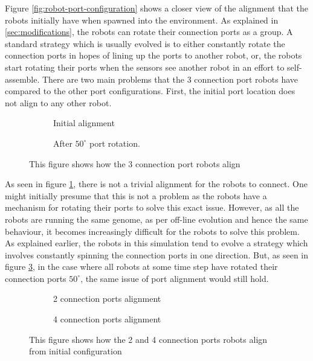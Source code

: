 Figure \ref{fig:robot-port-configuration} shows a closer view of the alignment that the robots initially have when spawned into the environment.
As explained in \ref{sec:modifications}, the robots can rotate their connection ports as a group.
A standard strategy which is usually evolved is to either constantly rotate the connection ports in hopes of lining up the ports to another robot, or, the robots start rotating their ports when the sensors see another robot in an effort to self-assemble.
There are two main problems that the 3 connection port robots have compared to the other port configurations.
First, the initial port location does not align to any other robot.


\begin{figure}[H]
	\begin{subfigure}[t]{0.49\textwidth}
		\centering
		\caption{Initial alignment}
		\label{3-port-guided-allignment}
	\end{subfigure}
	\begin{subfigure}[t]{0.49\textwidth}
		\centering
		\caption{After $50^{\circ}$ port rotation.}
		\label{3-port-guided-allignment-offset}
	\end{subfigure}
	\caption{This figure shows how the 3 connection port robots align}
\end{figure}


As seen in figure \ref{3-port-guided-allignment}, there is not a trivial alignment for the robots to connect.
One might initially presume that this is not a problem as the robots have a mechanism for rotating their ports to solve this exact issue.
However, as all the robots are running the same genome, as per off-line evolution and hence the same behaviour, it becomes increasingly difficult for the robots to solve this problem.
As explained earlier, the robots in this simulation tend to evolve a strategy which involves constantly spinning the connection ports in one direction.
But, as seen in figure \ref{3-port-guided-allignment-offset}, in the case where all robots at some time step have rotated their connection ports $50^{\circ}$, the same issue of port alignment would still hold.

\begin{figure}[H]
	\begin{subfigure}[t]{0.49\textwidth}
		\centering
		\caption{2 connection ports alignment}
		\label{2-port-guided-allignment}
	\end{subfigure}
	\begin{subfigure}[t]{0.49\textwidth}
		\centering
		\caption{4 connection ports alignment}
		\label{4-port-guided-allignment}
	\end{subfigure}
	\caption{This figure shows how the 2 and 4 connection ports robots align from initial configuration}
	\label{2-4-port-guided-allignment}
\end{figure}

